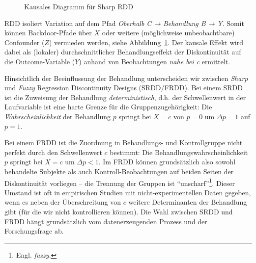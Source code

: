 \documentclass[
  a4paper,
  DIV=11,
  oneside]{scrreprt}
\begin{document}
\begin{figure}[t]


\caption{\label{fig-CDRDD}Kausales Diagramm für Sharp RDD}

\end{figure}%

RDD isoliert Variation auf dem Pfad \emph{Oberhalb C → Behandlung B →
Y}. Somit können Backdoor-Pfade über \(X\) oder weitere (möglichweise
unbeobachtbare) Confounder (\(Z\)) vermieden werden, siehe
Abbildung~\ref{fig-CDRDD}. Der kausale Effekt wird dabei als (lokaler)
durchschnittlicher Behandlungseffekt der Diskontinuität auf die
Outcome-Variable (\(Y\)) anhand von Beobachtungen \emph{nahe bei c}
ermittelt.

Hinsichtlich der Beeinflussung der Behandlung unterscheiden wir zwischen
\emph{Sharp} und \emph{Fuzzy} Regression Discontinuity Designs
(SRDD/FRDD). Bei einem SRDD ist die Zuweisung der Behandlung
\emph{deterministisch}, d.h. der Schwellenwert in der Laufvariable ist
eine harte Grenze für die Gruppenzugehörigkeit: Die
\emph{Wahrscheinlichkeit} der Behandlung \(p\) springt bei \(X=c\) von
\(p=0\) um \(\Delta p = 1\) auf \(p=1\).

Bei einem FRDD ist die Zuordnung in Behandlungs- und Kontrollgruppe
nicht perfekt durch den Schwellenwert \(c\) bestimmt: Die
Behandlungswahrscheinlichkeit \(p\) springt bei \(X=c\) um
\(\Delta p<1\). Im FRDD können grundsätzlich also sowohl behandelte
Subjekte als auch Kontroll-Beobachtungen auf beiden Seiten der
Diskontinuität vorliegen -- die Trennung der Gruppen ist
``unscharf''\footnote{Engl. \emph{fuzzy}.}. Dieser Umstand ist oft in
empirischen Studien mit nicht-experimentellen Daten gegeben, wenn es
neben der Überschreitung von \(c\) weitere Determinanten der Behandlung
gibt (für die wir nicht kontrollieren können). Die Wahl zwischen SRDD
und FRDD hängt grundsätzlich vom datenerzeugenden Prozess und der
Forschungsfrage ab.
\end{document}
